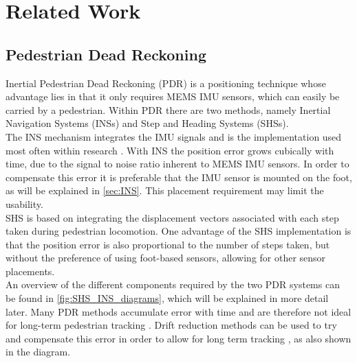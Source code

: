 \chapter{Related Work}


\section{Pedestrian Dead Reckoning}
Inertial Pedestrian Dead Reckoning (PDR) is a positioning technique whose advantage lies in that it only requires MEMS IMU sensors, which can easily be carried by a pedestrian. Within PDR there are two methods, namely Inertial Navigation Systems (INSs) and Step and Heading Systems (SHSs).\\
The INS mechanism integrates the IMU signals and is the implementation used most often within research \cite{Diez2018b}. With INS the position error grows cubically with time, due to the signal to noise ratio inherent to MEMS IMU sensors\cite{Harle2013}. In order to compensate this error it is preferable  that the IMU sensor is mounted on the foot, as will be explained in \cref{sec:INS}. This placement requirement may limit the usability. \\
SHS is based on integrating the displacement vectors associated with each step taken during pedestrian locomotion. One advantage of the SHS implementation is that the position error is also proportional to the number of steps taken, but without the preference of using foot-based sensors, allowing for other sensor placements. \\
An overview of the different components required by the two PDR systems can be found in \cref{fig:SHS_INS_diagrams}, which will be explained in more detail later. Many PDR methods accumulate error with time and are therefore not ideal for long-term pedestrian tracking \cite{Hardegger2012}. Drift reduction methods can be used to try and compensate this error in order to allow for long term tracking \cite{MunozDiaz2019a}, as also shown in the diagram.

